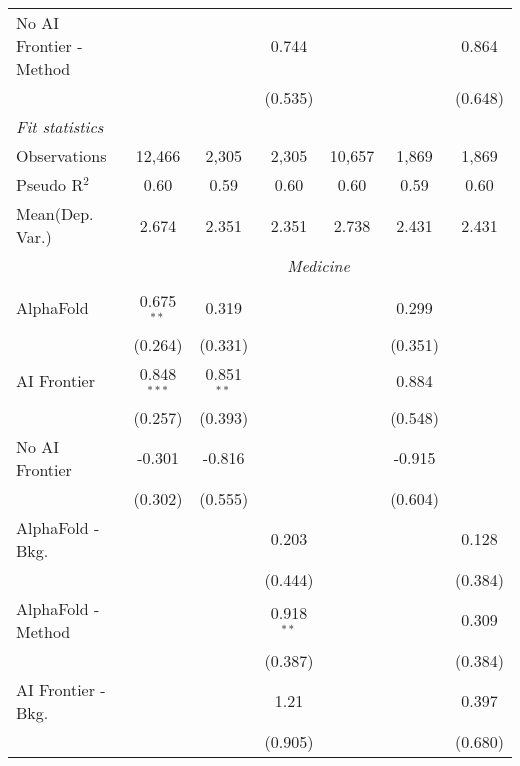 \begin{tabular}{lcccccc}
   No AI Frontier - Method &               &              & 0.744        &               &              & 0.864\\   
                           &               &              & (0.535)      &               &              & (0.648)\\   
   \midrule
   \emph{Fit statistics}\\
   Observations            & 12,466        & 2,305        & 2,305        & 10,657        & 1,869        & 1,869\\  
   Pseudo R$^2$            & 0.60          & 0.59         & 0.60         & 0.60          & 0.59         & 0.60\\  
   
Mean(Dep. Var.) & 2.674 & 2.351 & 2.351 & 2.738 & 2.431 & 2.431 \\
 & \multicolumn{6}{c}{\textit{Medicine}} \\ \\
   AlphaFold               & 0.675$^{**}$  & 0.319        &              &        & 0.299   &   \\   
                           & (0.264)       & (0.331)      &              &        & (0.351) &   \\   
   AI Frontier             & 0.848$^{***}$ & 0.851$^{**}$ &              &        & 0.884   &   \\   
                           & (0.257)       & (0.393)      &              &        & (0.548) &   \\   
   No AI Frontier          & -0.301        & -0.816       &              &        & -0.915  &   \\   
                           & (0.302)       & (0.555)      &              &        & (0.604) &   \\   
   AlphaFold - Bkg.        &               &              & 0.203        &        &         & 0.128\\   
                           &               &              & (0.444)      &        &         & (0.384)\\   
   AlphaFold - Method      &               &              & 0.918$^{**}$ &        &         & 0.309\\   
                           &               &              & (0.387)      &        &         & (0.384)\\   
   AI Frontier - Bkg.      &               &              & 1.21         &        &         & 0.397\\   
                           &               &              & (0.905)      &        &         & (0.680)\\   

\end{tabular}

